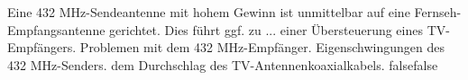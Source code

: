     {Eine 432 MHz-Sendeantenne mit hohem Gewinn ist unmittelbar auf eine Fernseh-Empfangsantenne gerichtet. Dies führt ggf. zu ...}
    {einer Übersteuerung eines TV-Empfängers.}
    {Problemen mit dem 432 MHz-Empfänger.}
    {Eigenschwingungen des 432 MHz-Senders.}
    {dem Durchschlag des TV-Antennenkoaxialkabels.}
    {false}{false}